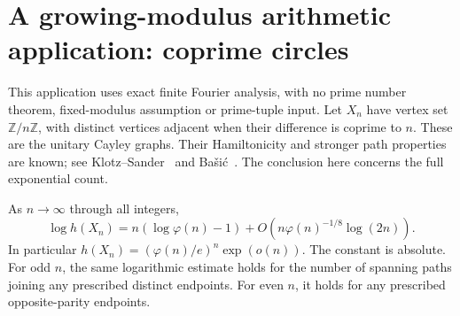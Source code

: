 \section{A growing-modulus arithmetic application: coprime circles}
\label{sec:coprimecircles}
This application uses exact finite Fourier analysis, with no
prime number theorem, fixed-modulus assumption or prime-tuple input.
Let \(X_n\) have vertex set \(\mathbb Z/n\mathbb Z\), with
distinct vertices adjacent when their difference is coprime to \(n\).
These are the unitary Cayley graphs.
Their Hamiltonicity and stronger path properties are known;
see Klotz--Sander~\cite{KS} and Ba\v{s}i\'c~\cite{Basic}.
The conclusion here concerns the full exponential count.

\begin{theorem}
\label{thm:coprimecircles}
As \(n\to\infty\) through all integers,
\[
 \log h(X_n)
   =n(\log\varphi(n)-1)
       +O\left(n\varphi(n)^{-1/8}\log(2n)\right).
\]
In particular \(h(X_n)=(\varphi(n)/e)^n\exp(o(n))\).
The constant is absolute.
For odd \(n\), the same logarithmic estimate holds for the
number of spanning paths joining any prescribed distinct endpoints.
For even \(n\), it holds for any prescribed opposite-parity endpoints.
\end{theorem}
